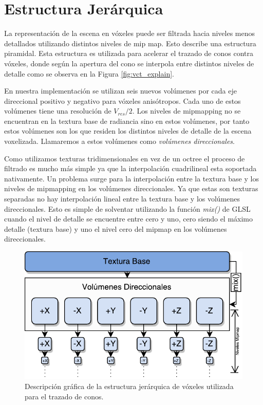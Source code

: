\section{Estructura Jerárquica} %
\label{sec:estructura_jerarquica_impl}
La representación de la escena en vóxeles puede ser filtrada hacia niveles menos detallados utilizando distintos niveles de mip map. Esto describe una estructura piramidal. Esta estructura es utilizada para acelerar el trazado de conos contra vóxeles, donde según la apertura del cono se interpola entre distintos niveles de detalle como se observa en la Figura \ref{fig:vct_explain}.

En nuestra implementación se utilizan seis nuevos volúmenes por cada eje direccional positivo y negativo para vóxeles anisótropos. Cada uno de estos volúmenes tiene una resolución de $V_{res}/{2}$. Los niveles de mipmapping no se encuentran en la textura base de radiancia sino en estos volúmenes, por tanto estos volúmenes son los que residen los distintos niveles de detalle de la escena voxelizada. Llamaremos a estos volúmenes como \emph{volúmenes direccionales}.

Como utilizamos texturas tridimensionales en vez de un octree el proceso de filtrado es mucho más simple ya que la interpolación cuadrilineal esta soportada nativamente. Un problema surge para la interpolación entre la textura base y los niveles de mipmapping en los volúmenes direccionales. Ya que estas son texturas separadas no hay interpolación lineal entre la textura base y los volúmenes direccionales. Esto es simple de solventar utilizando la función \emph{mix()} de GLSL cuando el nivel de detalle se encuentre entre cero y uno, cero siendo el máximo detalle (textura base) y uno el nivel cero del mipmap en los volúmenes direccionales.

\begin{figure}[H]
    \centering
    \includegraphics[width=.8\linewidth]{media/hierarchy.pdf}
    \caption{Descripción gráfica de la estructura jerárquica de vóxeles utilizada para el trazado de conos.}
\end{figure}

